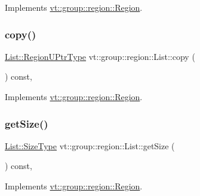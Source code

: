 Implements \hyperlink{structvt_1_1group_1_1region_1_1_region_a1e0ebd7367476fb397faf06a03b5583c}{vt\+::group\+::region\+::\+Region}.

\mbox{\label{structvt_1_1group_1_1region_1_1_list_ac5885572f4cd651003cd6012ba247cda}} 
\subsubsection{\texorpdfstring{copy()}{copy()}}
{\footnotesize\ttfamily \hyperlink{structvt_1_1group_1_1region_1_1_region_ae5f42cf159116a3cf8bd65423eb01037}{List\+::\+Region\+U\+Ptr\+Type} vt\+::group\+::region\+::\+List\+::copy (\begin{DoxyParamCaption}{ }\end{DoxyParamCaption}) const\hspace{0.3cm}{\ttfamily [override]}, {\ttfamily [virtual]}}



Implements \hyperlink{structvt_1_1group_1_1region_1_1_region_a040d20a4f8c6fa351d7fe1cbfcae3a03}{vt\+::group\+::region\+::\+Region}.

\mbox{\label{structvt_1_1group_1_1region_1_1_list_a9a74188a75483097c41253616527ac46}} 
\subsubsection{\texorpdfstring{get\+Size()}{getSize()}}
{\footnotesize\ttfamily \hyperlink{structvt_1_1group_1_1region_1_1_region_a9bb381adf31111aae34dbc644bad6c1f}{List\+::\+Size\+Type} vt\+::group\+::region\+::\+List\+::get\+Size (\begin{DoxyParamCaption}{ }\end{DoxyParamCaption}) const\hspace{0.3cm}{\ttfamily [override]}, {\ttfamily [virtual]}}



Implements \hyperlink{structvt_1_1group_1_1region_1_1_region_ab0db5f78c57943b4b9973ba2c7c619f7}{vt\+::group\+::region\+::\+Region}.

